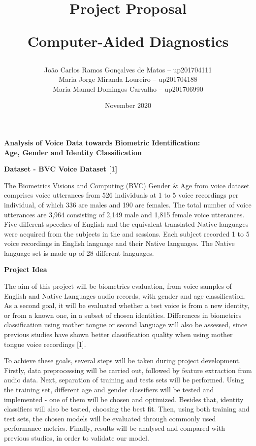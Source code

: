 \documentclass{article}
\title{\textbf{Project Proposal}\par Computer-Aided Diagnostics}
\author{
João Carlos Ramos Gonçalves de Matos – up201704111\\
Maria Jorge Miranda Loureiro – up201704188\\
Maria Manuel Domingos Carvalho – up201706990\\
}
\date{\nth{9} November 2020}
\begin{document}
\maketitle
\thispagestyle{empty} 


\centering
\Large
\textbf{Analysis of Voice Data towards Biometric Identification:\\ Age, Gender and Identity Classification}
\vspace{5mm}

\justify
\normalsize
\setlength{\parindent}{0pt}
\textbf{Dataset - BVC Voice Dataset [1]}\par

The Biometrics Visions and Computing (BVC) Gender \& Age from voice dataset comprises voice utterances from 526 individuals at 1 to 5 voice recordings per individual, of which 336 are males and 190 are females. The total number of voice utterances are 3,964 consisting of 2,149 male and 1,815 female voice utterances. Five different speeches of English and the equivalent translated Native languages were acquired from the subjects in the  and  sessions. Each subject recorded 1 to 5 voice recordings in English language and their Native languages. The Native language set is made up of 28 different languages.\par

\vspace{2mm}
\textbf{Project Idea}\par
 The aim of this project will be biometrics evaluation, from voice samples of English and Native Languages audio records, with gender and age classification. As a second goal, it will be evaluated whether a test voice is from a new identity, or from a known one, in a subset of chosen identities. Differences in biometrics classification using mother tongue or second language will also be assessed, since previous studies have shown better classification quality when using mother tongue voice recordings [1]. \par
 
 To achieve these goals, several steps will be taken during project development. Firstly, data preprocessing will be carried out, followed by feature extraction from audio data. Next, separation of training and tests sets will be performed. Using the training set, different age and gender classifiers will be tested and implemented - one of them will be chosen and optimized. Besides that, identity classifiers will also be tested, choosing the best fit. Then, using both training and test sets, the chosen models will be evaluated through commonly used performance metrics. Finally, results will be analysed and compared with previous studies, in order to validate our model.
\end{document}
